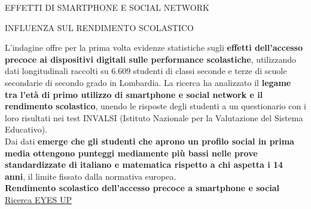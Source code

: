 \documentclass[aspectratio=1610]{beamer}
\begin{document}
\begin{frame}{EFFETTI DI SMARTPHONE E SOCIAL NETWORK}
    \begin{alertblock}{INFLUENZA SUL RENDIMENTO SCOLASTICO}
        \begin{minipage}{0.98\linewidth}
            \justifying
            L’indagine offre per la prima volta evidenze statistiche sugli \textbf{effetti dell’accesso 
            precoce ai dispositivi digitali sulle performance scolastiche}, utilizzando dati longitudinali 
            raccolti su 6.609 studenti di classi seconde e terze di scuole secondarie di secondo grado 
            in Lombardia. La ricerca ha analizzato il \textbf{legame tra l’età di primo utilizzo di smartphone 
            e social network e il rendimento scolastico}, unendo le risposte degli studenti a un questionario 
            con i loro risultati nei test INVALSI (Istituto Nazionale per la Valutazione del Sistema Educativo).\\
            Dai dati \textbf{emerge che gli studenti che aprono un profilo social in prima media ottengono punteggi 
            mediamente più bassi nelle prove standardizzate di italiano e matematica rispetto a 
            chi aspetta i 14 anni}, il limite fissato dalla normativa europea.\\
            \bigskip
            \tiny{\textbf{Rendimento scolastico dell'accesso precoce a smartphone e social}}\\
            \tiny{\href{https://www.unimib.it/news/presentata-milano-bicocca-ricerca-eyes-dedicata-agli-effetti-sul-rendimento-scolastico-dellaccesso}{Ricerca EYES UP}}
        \end{minipage}
    \end{alertblock}
\end{frame}
\end{document}
